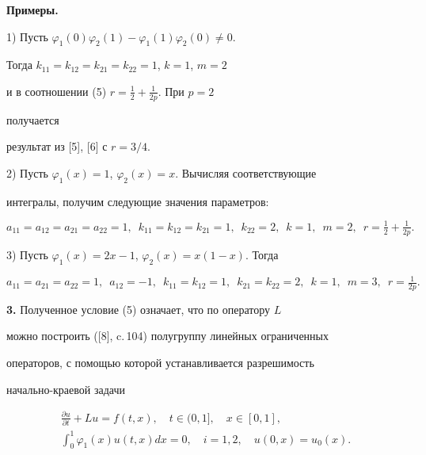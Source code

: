  


{\bf Примеры.} 


 


1) Пусть $\varphi_1(0)\varphi_2(1)-\varphi_1(1)\varphi_2(0)\ne0$. 


Тогда $k_{11}=k_{12}=k_{21}=k_{22}=1$, $k=1$, $m=2$ 


и в соотношении (5)\; $r=\frac{1}{2}+\frac{1}{2p}$. При $p=2$ 


получается  


результат из [5], [6] с $r=3/4$. 


 


2) Пусть $\varphi_1(x)=1$, $\varphi_2(x)=x$. Вычисляя соответствующие 


интегралы, получим следующие значения параметров:


$$ 


a_{11}=a_{12}=a_{21}=a_{22}=1, 


\ \; k_{11}=k_{12}=k_{21}=1,\ \; k_{22}=2, 


\ \; k=1,\ \; m=2,\ \; r=\tfrac{1}{2}+\tfrac{1}{2p}. 


$$ 


 


3) Пусть $\varphi_1(x)=2x-1$, $\varphi_2(x)=x(1-x)$. Тогда  


$$ 


a_{11}=a_{21}=a_{22}=1,\ \; a_{12}=-1, 


\ \; k_{11}=k_{12}=1,\ \; k_{21}=k_{22}=2, 


\ \; k=1,\ \; m=3,\ \; r=\tfrac{1}{2p}. 


$$ 


\medskip 


 


{\bf 3.} Полученное условие (5) означает, что по оператору $L$ 


можно построить ([8], c.\,104) полугруппу линейных ограниченных 


операторов, с помощью которой устанавливается разрешимость  


начально-краевой задачи 


\begin{equation} 


\begin{array}{c} 


\displaystyle\frac{\partial u}{\partial t}+L u=f(t,x), 


\quad t\in(0,1],\quad x\in[0,1],\\[3mm] 


% 


\displaystyle\int^1_0\varphi_1(x)u(t,x)dx=0,\quad 


i=1,2,\quad u(0,x)=u_0(x). 


\end{array} 


\end{equation} 



